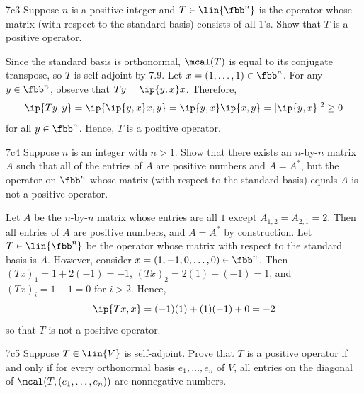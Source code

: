 \begin{exercise}{7c3}
    Suppose $n$ is a positive integer and $T \in \lin{\fbb^n}$ is the operator whose matrix (with respect to the standard basis) consists of all $1$'s.
    Show that $T$ is a positive operator.
\end{exercise}

\begin{sol}
    Since the standard basis is orthonormal, $\mcal(T)$ is equal to its conjugate transpose, so $T$ is self-adjoint by 7.9.
    Let $x = (1, \ldots, 1) \in \fbb^n$.
    For any $y \in \fbb^n$, observe that $Ty = \ip{y, x} x$.
    Therefore,
    \[
        \ip{T y, y} = \ip{\ip{y, x} x, y} = \ip{y, x} \ip{x, y} = |\ip{y, x}|^2 \geq 0
    \]
    for all $y \in \fbb^n$.
    Hence, $T$ is a positive operator.
\end{sol}

\begin{exercise}{7c4}
    Suppose $n$ is an integer with $n > 1$.
    Show that there exists an $n$-by-$n$ matrix $A$ such that all of the entries of $A$ are positive numbers and $A = A^\ast$, but the operator on $\fbb^n$ whose matrix (with respect to the standard basis) equals $A$ is not a positive operator.
\end{exercise}

\begin{sol}
    Let $A$ be the $n$-by-$n$ matrix whose entries are all $1$ except $A_{1, 2} = A_{2, 1} = 2$.
    Then all entries of $A$ are positive numbers, and $A = A^\ast$ by construction.
    Let $T \in \lin{\fbb^n}$ be the operator whose matrix with respect to the standard basis is $A$.
    However, consider $x = (1, -1, 0, \ldots, 0) \in \fbb^n$.
    Then $(T x)_1 = 1 + 2(-1) = -1$, $(T x)_2 = 2(1) + (-1) = 1$, and $(T x)_i = 1 - 1 = 0$ for $i > 2$.
    Hence,
    \[
        \ip{T x, x} = (-1)(1) + (1)(-1) + 0 = -2
    \]
    so that $T$ is not a positive operator.
\end{sol}

\begin{exercise}{7c5}
    Suppose $T \in \lin{V}$ is self-adjoint.
    Prove that $T$ is a positive operator if and only if for every orthonormal basis $e_1, \ldots, e_n$ of $V$, all entries on the diagonal of $\mcal(T, (e_1, \ldots, e_n))$ are nonnegative numbers.
\end{exercise}

